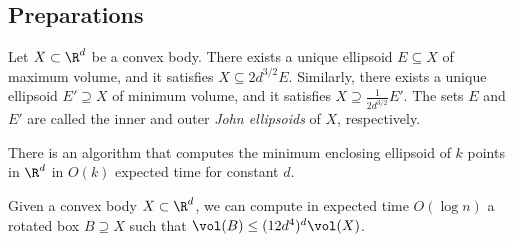 \subsection{Preparations}
%
\begin{theorem}
    \label{thm:john-ellipsoid}
    Let $X \subset \R^d$ be a convex body. There exists a unique ellipsoid $E \subseteq X$ of maximum volume, and it satisfies $X \subseteq 2d^{3/2} E$. Similarly, there exists a unique ellipsoid $E' \supseteq X$ of minimum volume, and it satisfies $X \supseteq \frac{1}{2d^{3/2}} E'$. The sets $E$ and $E'$ are called the inner and outer \emph{John ellipsoids} of $X$, respectively.
\end{theorem}
%
\begin{theorem}
    \label{thm:min-ellipsoid}
    There is an algorithm that computes the minimum enclosing ellipsoid of $k$ points in $\R^d$ in $O(k)$ expected time for constant $d$.
\end{theorem}
%
\begin{corollary}
    \label{cor:bounding-box}
    Given a convex body $X \subset \R^d$, we can compute in expected time $O(\log n)$ a rotated box $B \supseteq X$ such that $\vol(B) \leq (12d^4)^d \vol(X)$.
\end{corollary}
%
